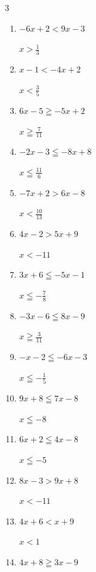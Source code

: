 \begin{multicols}{3}
\begin{enumerate}
        $\displaystyle x<-\frac{1}{2}$

  \item $-6x+2<9x-3$

        $\displaystyle x>\frac{1}{3}$

  \item $x-1<-4x+2$

        $\displaystyle x<\frac{3}{5}$

  \item $6x-5\geqq -5x+2$

        $\displaystyle x\geqq \frac{7}{11}$

  \item $-2x-3\leqq -8x+8$

        $\displaystyle x\leqq \frac{11}{6}$

  \item $-7x+2>6x-8$

        $\displaystyle x<\frac{10}{13}$

  \item $4x-2>5x+9$

        $\displaystyle x<-11$

  \item $3x+6\leqq -5x-1$

        $\displaystyle x\leqq -\frac{7}{8}$

  \item $-3x-6\leqq 8x-9$

        $\displaystyle x\geqq \frac{3}{11}$

  \item $-x-2\leqq -6x-3$

        $\displaystyle x\leqq -\frac{1}{5}$

\columnbreak %

  \item $9x+8\leqq 7x-8$

        $\displaystyle x\leqq -8$

  \item $6x+2\leqq 4x-8$

        $\displaystyle x\leqq -5$

  \item $8x-3>9x+8$

        $\displaystyle x<-11$

  \item $4x+6<x+9$

        $\displaystyle x<1$

  \item $4x+8\geqq 3x-9$


\end{enumerate}
\end{multicols}

